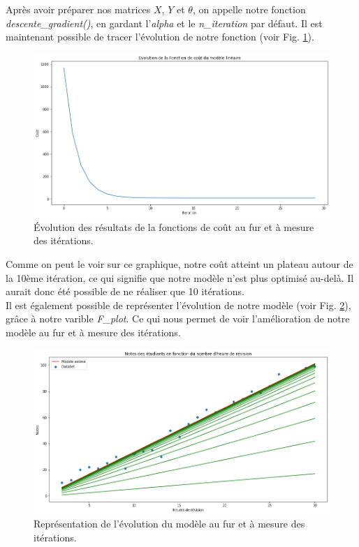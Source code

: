 \documentclass[french]{article}
\begin{document}
\noindent Après avoir préparer nos matrices $X$, $Y$ et $\theta$, on appelle notre fonction \textit{descente\_gradient()}, en gardant l'\textit{alpha} et le \textit{n\_iteration} par défaut. Il est maintenant possible de tracer l'évolution de notre fonction (voir Fig. \ref{fig:JMLS}). 

\begin{figure}[!htbp]
    \centering
    \includegraphics[width=\textwidth]{Rapport/images/cout_MLS.png}
    \caption{Évolution des résultats de la fonctions de coût au fur et à mesure des itérations.}
    \label{fig:JMLS}
\end{figure}

Comme on peut le voir sur ce graphique, notre coût atteint un plateau autour de la 10ème itération, ce qui signifie que notre modèle n'est plus optimisé au-delà. Il aurait donc été possible de ne réaliser que 10 itérations.\\

Il est également possible de représenter l'évolution de notre modèle (voir Fig. \ref{fig:evo_MLS}), grâce à notre varible \textit{F\_plot}. Ce qui nous permet de voir l'amélioration de notre modèle au fur et à mesure des itérations.\\

\begin{figure}[!htbp]
    \centering
    \includegraphics[width=\textwidth]{Rapport/images/evo_MLS.png}
    \caption{Représentation de l'évolution du modèle au fur et à mesure des itérations.}
    \label{fig:evo_MLS}
\end{figure}
\end{document}
